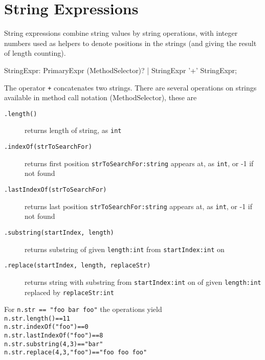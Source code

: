 \section{String Expressions}

String expressions combine string values by string operations, with integer numbers used as helpers to denote positions in the strings (and giving the result of length counting).

\begin{rail}
  StringExpr: PrimaryExpr (MethodSelector)? | StringExpr '+' StringExpr;
\end{rail}
The operator \texttt{+} concatenates two strings.
There are several operations on strings available in method call notation (MethodSelector), these are

\begin{description}
\item[\texttt{.length()}] returns length of string, as \texttt{int}
\item[\texttt{.indexOf(strToSearchFor)}] returns first position \texttt{strToSearchFor:string} appears at, as \texttt{int}, or -1 if not found
\item[\texttt{.lastIndexOf(strToSearchFor)}] returns last position \texttt{strToSearchFor:string} appears at, as \texttt{int}, or -1 if not found
\item[\texttt{.substring(startIndex, length)}] returns substring of given \texttt{length:int} from \texttt{startIndex:int} on
\item[\texttt{.replace(startIndex, length, replaceStr)}] returns string with substring from \texttt{startIndex:int} on of given \texttt{length:int} replaced by \texttt{replaceStr:int}
\end{description}

\begin{example}
For \texttt{n.str == "foo bar foo"} the operations yield \\
\texttt{n.str.length()==11} \\
\texttt{n.str.indexOf("foo")==0} \\
\texttt{n.str.lastIndexOf("foo")==8} \\
\texttt{n.str.substring(4,3)=="bar"} \\
\texttt{n.str.replace(4,3,"foo")=="foo foo foo"} \\
\end{example}


